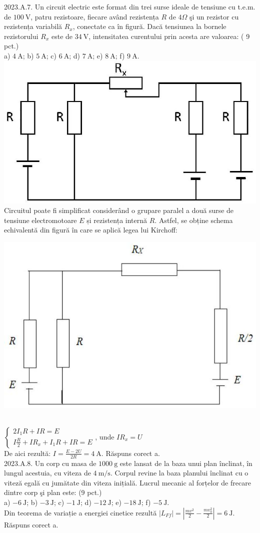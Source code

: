 2023.A.7. Un circuit electric este format din trei surse ideale de tensiune cu t.e.m. de $100 \mathrm{~V}$, patru rezistoare, fiecare având rezistența $R$ de $4 \Omega$ şi un rezistor cu rezistența variabilă $R_{x}$, conectate ca în figură. Dacă tensiunea la bornele rezistorului $R_{x}$ este de $34 \mathrm{~V}$, intensitatea curentului prin acesta are valoarea: ( 9 pct.)\\ a) $4 \mathrm{~A}$; b) $5 \mathrm{~A}$; c) $6 \mathrm{~A}$; d) $7 \mathrm{~A}$; e) $8 \mathrm{~A}$; f) $9 \mathrm{~A}$.\\ \includegraphics[width=0.4\linewidth]{images/2025_08_19_17c3b9471cd89f0defc4g-02(1)}\\ Circuitul poate fi simplificat considerând o grupare paralel a două surse de tensiune electromotoare $E$ și rezistența internă $R$. Astfel, se obține schema echivalentă din figură în care se aplică legea lui Kirchoff:\\ \begin{center} \includegraphics[width=0.4\linewidth]{images/2025_08_19_17c3b9471cd89f0defc4g-03(1)} \end{center}\\ $\left\{\begin{array}{c} 2 I_{1} R+I R=E \\ I \frac{R}{2}+I R_{x}+I_{1} R+I R=E \end{array}\right.$, unde $I R_{x}=U$\\ De aici rezultă: $I=\frac{E-2 U}{2 R}=4 \mathrm{~A}$. Răspuns corect a.\\

2023.A.8. Un corp cu masa de $1000 \mathrm{~g}$ este lansat de la baza unui plan înclinat, în lungul acestuia, cu viteza de $4 \mathrm{~m} / \mathrm{s}$. Corpul revine la baza planului înclinat cu o viteză egală cu jumătate din viteza inițială. Lucrul mecanic al forțelor de frecare dintre corp şi plan este: (9 pct.)\\ a) $-6 \mathrm{~J}$; b) $-3 \mathrm{~J}$; c) $-1 \mathrm{~J}$; d) $-12 \mathrm{~J}$; e) $-18 \mathrm{~J}$; f) $-5 \mathrm{~J}$.\\ Din teorema de variație a energiei cinetice rezultă $\left|L_{Ff}\right|=\left|\frac{m v^{2}}{2}-\frac{m v_{0}^{2}}{2}\right|=6 \mathrm{~J}$. Răspuns corect a.\\

